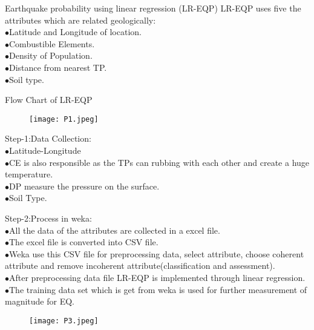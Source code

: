 \documentclass{beamer}
\begin{document}
\begin{frame}{Earthquake probability using linear regression (LR-EQP)}
LR-EQP uses five the attributes which are related geologically: \\
$\bullet$Latitude and Longitude of location.\\
$\bullet$Combustible Elements.\\
$\bullet$Density of Population.\\
$\bullet$Distance from nearest TP.\\
$\bullet$Soil type.
\end{frame}
\begin{frame}{Flow Chart of LR-EQP}
    \begin{figure}[h]
    \centering
    \texttt{[image: P1.jpeg]}
\end{figure} 

\end{frame}
 \begin{frame}{}
 Step-1:Data Collection:\\
 $\bullet$Latitude-Longitude\\
 $\bullet$CE is also responsible as the TPs can rubbing with each other and create a huge temperature.\\
 $\bullet$DP measure the pressure on the surface.\\
 $\bullet$Soil Type.\\
\end{frame}
\begin{frame}{}
Step-2:Process in weka:\\
$\bullet$All the data of the attributes are collected in a excel file.\\
$\bullet$The excel file is converted into CSV file.\\
$\bullet$Weka use this CSV file for preprocessing data, select attribute, choose coherent attribute and remove incoherent attribute(classification and assessment).\\
$\bullet$After preprocessing data file LR-EQP is implemented through linear regression.\\
$\bullet$The training data set which is get from weka is used for further measurement of magnitude for EQ.\\
 \end{frame}
 \begin{frame}
   \begin{figure}[h]
    \centering
    \texttt{[image: P3.jpeg]}
\end{figure}   
 \end{frame}
\end{document}
